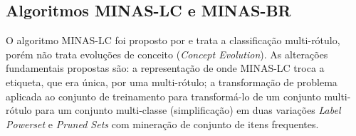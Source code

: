 
\subsection{Algoritmos MINAS-LC e MINAS-BR}\label{sub:minas-derivados}

O algoritmo MINAS-LC foi proposto por  e trata a classificação
multi-rótulo, porém não trata evoluções de conceito (\emph{Concept Evolution}).
As alterações fundamentais propostas são:
a representação de \cluster onde MINAS-LC troca a etiqueta, que era única, por uma multi-rótulo;
a transformação de problema aplicada ao conjunto de treinamento para transformá-lo de um
conjunto multi-rótulo para um conjunto multi-classe (simplificação)
em duas variações \emph{Label Powerset} e \emph{Pruned Sets} com
mineração de conjunto de itens frequentes.

